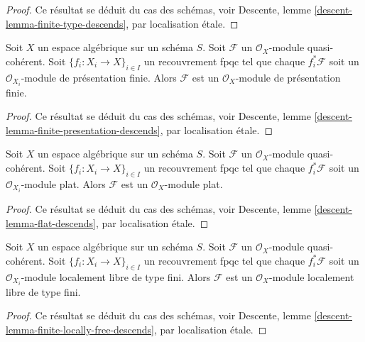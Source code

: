 \begin{proof}
Ce résultat se déduit du cas des schémas, voir
Descente, lemme \ref{descent-lemma-finite-type-descends},
par localisation \'etale.
\end{proof}

\begin{lemma}
\label{lemma-finite-presentation-descends}
Soit $X$ un espace algébrique sur un schéma $S$.
Soit $\mathcal{F}$ un $\mathcal{O}_X$-module quasi-cohérent.
Soit $\{f_i : X_i \to X\}_{i \in I}$ un recouvrement fpqc tel que
chaque $f_i^*\mathcal{F}$ soit un $\mathcal{O}_{X_i}$-module de présentation
finie. Alors $\mathcal{F}$ est un $\mathcal{O}_X$-module
de présentation finie.
\end{lemma}

\begin{proof}
Ce résultat se déduit du cas des schémas, voir
Descente, lemme \ref{descent-lemma-finite-presentation-descends},
par localisation \'etale.
\end{proof}

\begin{lemma}
\label{lemma-flat-descends}
Soit $X$ un espace algébrique sur un schéma $S$.
Soit $\mathcal{F}$ un $\mathcal{O}_X$-module quasi-cohérent.
Soit $\{f_i : X_i \to X\}_{i \in I}$ un recouvrement fpqc tel que
chaque $f_i^*\mathcal{F}$ soit un $\mathcal{O}_{X_i}$-module plat.
Alors $\mathcal{F}$ est un $\mathcal{O}_X$-module plat.
\end{lemma}

\begin{proof}
Ce résultat se déduit du cas des schémas, voir
Descente, lemme \ref{descent-lemma-flat-descends},
par localisation \'etale.
\end{proof}

\begin{lemma}
\label{lemma-finite-locally-free-descends}
Soit $X$ un espace algébrique sur un schéma $S$.
Soit $\mathcal{F}$ un $\mathcal{O}_X$-module quasi-cohérent.
Soit $\{f_i : X_i \to X\}_{i \in I}$ un recouvrement fpqc tel que
chaque $f_i^*\mathcal{F}$ soit un $\mathcal{O}_{X_i}$-module localement libre de type fini.
Alors $\mathcal{F}$ est un $\mathcal{O}_X$-module localement libre de type fini.
\end{lemma}

\begin{proof}
Ce résultat se déduit du cas des schémas, voir
Descente, lemme \ref{descent-lemma-finite-locally-free-descends},
par localisation \'etale.
\end{proof}

